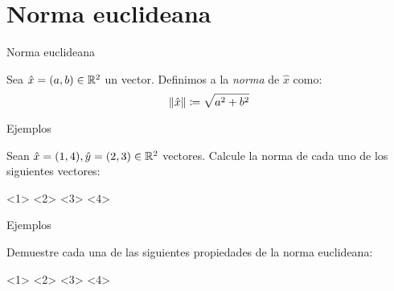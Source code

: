     \section{Norma euclideana}
    \begin{frame}{Norma euclideana}
        \begin{mdefinition}
            Sea $\hat{x}=(a,b)\in\rmath[2]$ un vector. Definimos a la \emph{norma} de $\hat{x}$ como:
            \[\norm{\hat{x}}\coloneqq\sqrt{a^2+b^2}\]
            \begin{figure}
                \centering
            \end{figure}
        \end{mdefinition}
    \end{frame}
    \begin{frame}{Ejemplos}
        \begin{example}
            Sean $\hat{x}=(1,4),\hat{y}=(2,3)\in\rmath[2]$ vectores. Calcule la norma de cada uno de los siguientes vectores:
            \begin{itemize}
                <1>
                <2>
                <3>
                <4>
            \end{itemize}
        \end{example}
    \end{frame}
    \begin{frame}{Ejemplos}
        \begin{example}
            Demuestre cada una de las siguientes propiedades de la norma euclideana:
            \begin{itemize}
                <1>
                <2>
                <3>
                <4>
            \end{itemize}
        \end{example}
    \end{frame}
